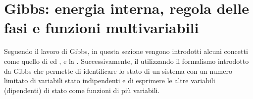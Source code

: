\documentclass[letterpaper,10pt,italian]{jupyterBook}
\begin{document}
\sphinxstepscope


\section{Gibbs: energia interna, regola delle fasi e funzioni multi\sphinxhyphen{}variabili}
\label{\detokenize{ch/thermodynamics/principles-gibbs-phase-rule:gibbs-energia-interna-regola-delle-fasi-e-funzioni-multi-variabili}}\label{\detokenize{ch/thermodynamics/principles-gibbs-phase-rule:physics-hs-thermodynamics-foundation-principles-gibbs-phase-rule}}\label{\detokenize{ch/thermodynamics/principles-gibbs-phase-rule::doc}}
\sphinxAtStartPar
Seguendo il lavoro di Gibbs, in questa sezione vengono introdotti alcuni concetti come quello di {\hyperref[\detokenize{ch/thermodynamics/principles-gibbs-phase-rule:physics-hs-thermodynamics-foundation-principles-gibbs-phase-rule-state-vars}]{}} ed {\hyperref[\detokenize{ch/thermodynamics/principles-gibbs-phase-rule:physics-hs-thermodynamics-foundation-principles-gibbs-phase-rule-internal-energy}]{}}, e la {\hyperref[\detokenize{ch/thermodynamics/principles-gibbs-phase-rule:physics-hs-thermodynamics-foundation-principles-gibbs-phase-rule-gibbs-phase-rule}]{}}. Successivamente, il {\hyperref[\detokenize{ch/thermodynamics/principles-gibbs-phase-rule:physics-hs-thermodynamics-foundation-principles-gibbs-phase-rule-first}]{}} utilizzando il formalismo introdotto da Gibbs che permette di identificare lo stato di un sistema con un numero limitato di variabili stato indipendenti e di esprimere le altre variabili (dipendenti) di stato come funzioni di più variabili.
\end{document}
